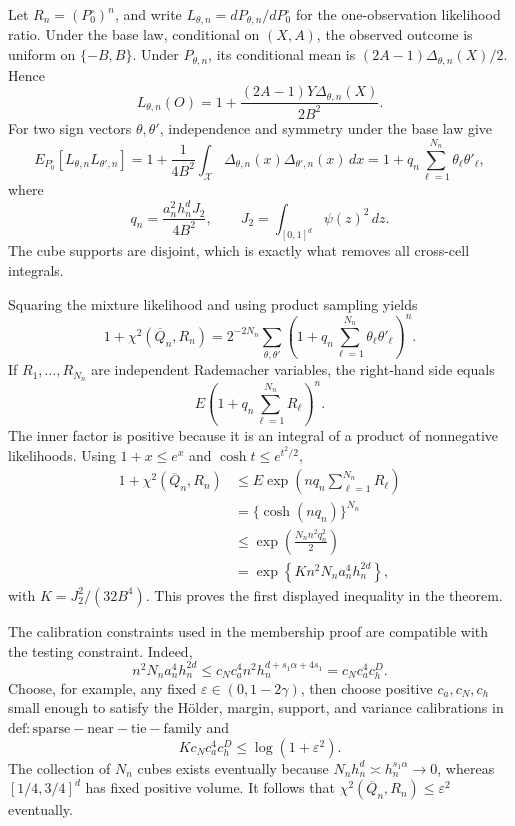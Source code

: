 Let \(R_n=(P_0^\circ)^n\), and write \(L_{\theta,n}=dP_{\theta,n}/dP_0^\circ\) for the one-observation likelihood ratio.  Under the base law, conditional on \((X,A)\), the observed outcome is uniform on \(\{-B,B\}\).  Under \(P_{\theta,n}\), its conditional mean is \((2A-1)\Delta_{\theta,n}(X)/2\).  Hence
\[
 L_{\theta,n}(O)
 =1+\frac{(2A-1)Y\Delta_{\theta,n}(X)}{2B^2}.
\]
For two sign vectors \(\theta,\theta'\), independence and symmetry under the base law give
\[
 E_{P_0^\circ}[L_{\theta,n}L_{\theta',n}]
 =1+\frac1{4B^2}\int_{\mathcal X}
 \Delta_{\theta,n}(x)\Delta_{\theta',n}(x)\,dx
 =1+q_n\sum_{\ell=1}^{N_n}\theta_\ell\theta'_\ell,
\]
where
\[
 q_n=\frac{a_n^2h_n^dJ_2}{4B^2},
 \qquad
 J_2=\int_{[0,1]^d}\psi(z)^2\,dz.
\]
The cube supports are disjoint, which is exactly what removes all cross-cell integrals.

Squaring the mixture likelihood and using product sampling yields
\[
 1+\chi^2(\overline Q_n,R_n)
 =2^{-2N_n}\sum_{\theta,\theta'}
 \left(1+q_n\sum_{\ell=1}^{N_n}\theta_\ell\theta'_\ell\right)^n.
\]
If \(R_1,\ldots,R_{N_n}\) are independent Rademacher variables, the right-hand side equals
\[
 E\left(1+q_n\sum_{\ell=1}^{N_n}R_\ell\right)^n.
\]
The inner factor is positive because it is an integral of a product of nonnegative likelihoods.  Using \(1+x\le e^x\) and \(\cosh t\le e^{t^2/2}\),
\[
 \begin{aligned}
 1+\chi^2(\overline Q_n,R_n)
 &\le E\exp\!\left(nq_n\sum_{\ell=1}^{N_n}R_\ell\right)\\
 &=\{\cosh(nq_n)\}^{N_n}\\
 &\le\exp\!\left(\frac{N_nn^2q_n^2}{2}\right)\\
 &=\exp\!\left\{K n^2N_na_n^4h_n^{2d}\right\},
 \end{aligned}
\]
with \(K=J_2^2/(32B^4)\).  This proves the first displayed inequality in the theorem.

The calibration constraints used in the membership proof are compatible with the testing constraint.  Indeed,
\[
 n^2N_na_n^4h_n^{2d}
 \le c_Nc_a^4n^2h_n^{d+s_1\alpha+4s_1}
 =c_Nc_a^4c_h^{D}.
\]
Choose, for example, any fixed \(\varepsilon\in(0,1-2\gamma)\), then choose positive \(c_a,c_N,c_h\) small enough to satisfy the Hölder, margin, support, and variance calibrations in \(\mathrm{def:sparse-near-tie-family}\) and
\[
 Kc_Nc_a^4c_h^D\le\log(1+\varepsilon^2).
\]
The collection of \(N_n\) cubes exists eventually because \(N_nh_n^d\asymp h_n^{s_1\alpha}\to0\), whereas \([1/4,3/4]^d\) has fixed positive volume.  It follows that \(\chi^2(\overline Q_n,R_n)\le\varepsilon^2\) eventually.

